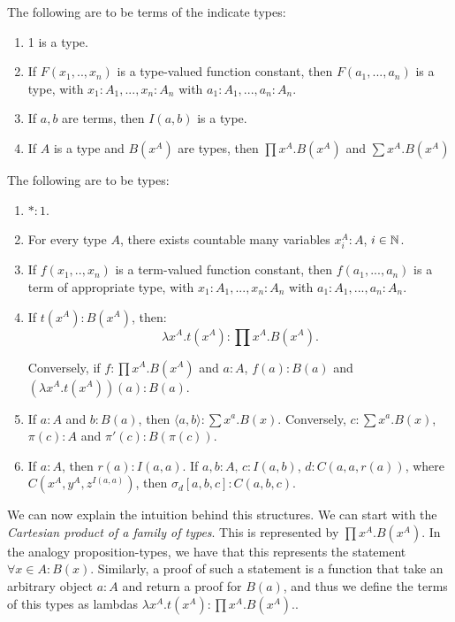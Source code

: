 \begin{definition}
  The following are to be terms of the indicate types:
  \begin{enumerate}
  \item 1 is a type.
  \item If $F(x_1,..,x_n)$ is a type-valued function constant, then $F(a_1,...,a_n)$ is a type, with  $x_1:A_1,...,x_n:A_n$ with $a_1:A_1,...,a_n:A_n$.
  \item If $a,b$ are terms, then $I(a,b)$ is a type.
  \item If $A$ is a type and $B(x^A)$ are types, then $\prod x^A. B(x^A)$ and  $\sum x^A. B(x^A)$
  \end{enumerate}
\end{definition}

\begin{definition}\label{1.1.2-seely}
  The following are to be types:
  \begin{enumerate}
  \item $*:1$.
  \item For every type $A$, there exists countable many variables $x_i^A : A$, $i\in \mathbb{N}$.
  \item If $f(x_1,..,x_n)$ is a term-valued function constant, then $f(a_1,...,a_n)$ is a term of appropriate type, with  $x_1:A_1,...,x_n:A_n$ with $a_1:A_1,...,a_n:A_n$.
  \item If $t(x^A) : B(x^A)$, then:
    $$\lambda x^A.t(x^A) : \prod x^A. B(x^A).$$

    Conversely, if $f : \prod x^A. B(x^A)$ and $a:A$, $f(a) : B(a)$ and $(\lambda x^A.t(x^A))(a) : B(a)$.
  \item If $a:A$ and $b:B(a)$, then $\langle a, b\rangle : \sum x^a. B(x)$. Conversely, $c : \sum x^a. B(x)$, $\pi (c) : A$ and $\pi'(c) : B(\pi(c))$. 
  \item If $a:A$, then $r(a): I(a,a)$. If $a,b : A$, $c : I(a,b)$, $d : C(a,a,r(a))$, where $C(x^A,y^A,z^{I(a,a)})$, then $\sigma_d[a,b,c] : C(a,b,c)$.  
  \end{enumerate}
\end{definition}


We can now explain the intuition behind this structures. We can start with the \emph{Cartesian product of a family of types}. This is represented by $\prod x^A. B(x^A)$. In the analogy proposition-types, we have that this represents the statement $\forall x \in A : B(x)$. Similarly, a proof of such a statement is a function that take an arbitrary object $a:A$ and return a proof for $B(a)$, and thus we define the terms of this types as lambdas $\lambda x^A.t(x^A) : \prod x^A. B(x^A).$.\\


